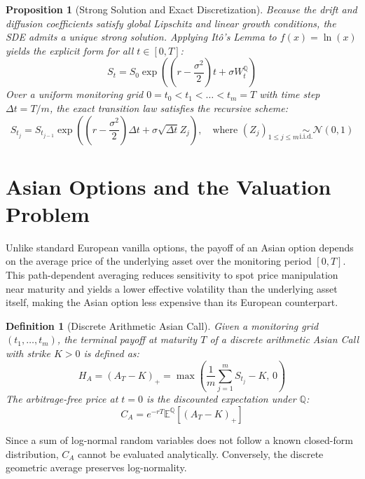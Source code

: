 \documentclass[11pt,a4paper]{article}
\newtheorem{proposition}{Proposition}
\newtheorem{definition}{Definition}
\newcommand{\E}{\mathbb{E}}
\newcommand{\Q}{\mathbb{Q}}
\begin{document}
\begin{proposition}[Strong Solution and Exact Discretization]
Because the drift and diffusion coefficients satisfy global Lipschitz and linear growth conditions, the SDE admits a unique strong solution. Applying Itô's Lemma to $f(x) = \ln(x)$ yields the explicit form for all $t \in [0,T]$:
\begin{equation}
    S_t = S_0 \exp\left( \left(r - \frac{\sigma^2}{2}\right)t + \sigma W_t^\Q \right)
\end{equation}
Over a uniform monitoring grid $0 = t_0 < t_1 < \dots < t_m = T$ with time step $\Delta t = T/m$, the exact transition law satisfies the recursive scheme:
\begin{equation}
    S_{t_{j}} = S_{t_{j-1}} \exp\left( \left(r - \frac{\sigma^2}{2}\right)\Delta t + \sigma \sqrt{\Delta t} Z_j \right), \quad \text{where } (Z_j)_{1 \le j \le m} \underset{\text{i.i.d.}}{\sim} \mathcal{N}(0,1)
\end{equation}
\end{proposition}

\section{Asian Options and the Valuation Problem}

Unlike standard European vanilla options, the payoff of an Asian option depends on the average price of the underlying asset over the monitoring period $[0,T]$. This path-dependent averaging reduces sensitivity to spot price manipulation near maturity and yields a lower effective volatility than the underlying asset itself, making the Asian option less expensive than its European counterpart.

\begin{definition}[Discrete Arithmetic Asian Call]
Given a monitoring grid $(t_1, \dots, t_m)$, the terminal payoff at maturity $T$ of a discrete arithmetic Asian Call with strike $K > 0$ is defined as:
\begin{equation}
    H_A = (A_T - K)_+ = \max\left( \frac{1}{m} \sum_{j=1}^m S_{t_j} - K, \, 0 \right)
\end{equation}
The arbitrage-free price at $t=0$ is the discounted expectation under $\Q$:
\begin{equation}
    C_A = e^{-rT} \E^\Q\left[ (A_T - K)_+ \right]
\end{equation}
\end{definition}

Since a sum of log-normal random variables does not follow a known closed-form distribution, $C_A$ cannot be evaluated analytically. Conversely, the discrete geometric average preserves log-normality.
\end{document}

